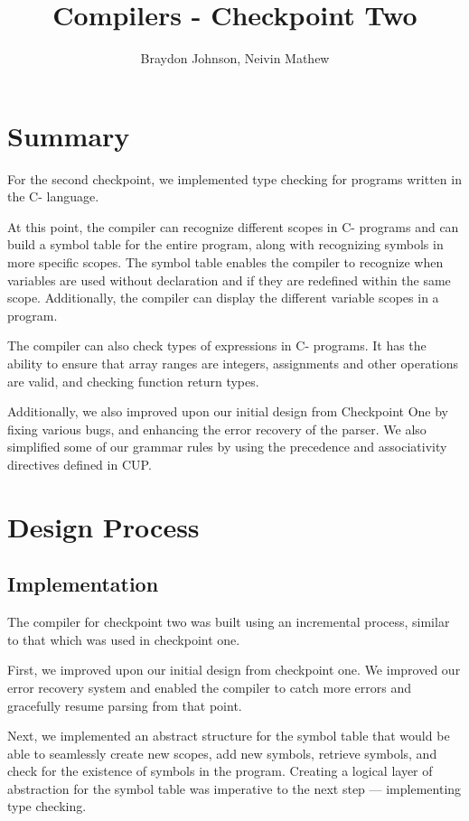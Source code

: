 \documentclass[12pt, letterpaper]{article}
\title{\LARGE{\textbf{Compilers - Checkpoint Two}}}
\author{Braydon Johnson, Neivin Mathew}
\begin{document}
\maketitle

\section{Summary}
For the second checkpoint, we implemented type checking for programs written in the C- language.

At this point, the compiler can recognize different scopes in C- programs and can build a symbol table for the entire program, along with recognizing symbols in more specific scopes. The symbol table enables the compiler to recognize when variables are used without declaration and if they are redefined within the same scope. Additionally, the compiler can display the different variable scopes in a program.

The compiler can also check types of expressions in C- programs. It has the ability to ensure that array ranges are integers, assignments and other operations are valid, and checking function return types.

Additionally, we also improved upon our initial design from Checkpoint One by fixing various bugs, and enhancing the error recovery of the parser. We also simplified some of our grammar rules by using the precedence and associativity directives defined in CUP.

\section{Design Process}
\subsection{Implementation}
The compiler for checkpoint two was built using an incremental process, similar to that which was used in checkpoint one.

First, we improved upon our initial design from checkpoint one. We improved our error recovery system and enabled the compiler to catch more errors and gracefully resume parsing from that point.

Next, we implemented an abstract structure for the symbol table that would be able to seamlessly create new scopes, add new symbols, retrieve symbols, and check for the existence of symbols in the program. Creating a logical layer of abstraction for the symbol table was imperative to the next step --- implementing type checking.
\end{document}
